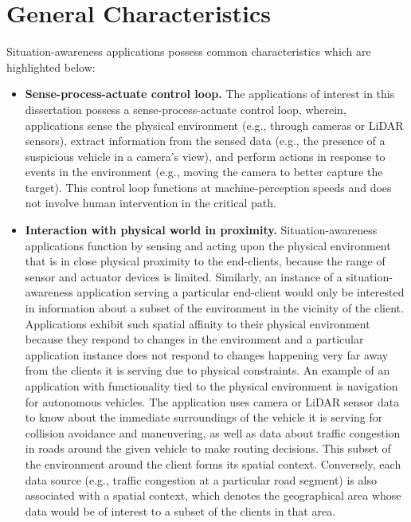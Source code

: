\section{General Characteristics}
\label{sec:app_characteristics}
Situation-awareness applications possess common characteristics which are highlighted below:
\begin{itemize}
\item \textbf{Sense-process-actuate control loop. }  The applications of interest in this dissertation possess a sense-process-actuate control loop, wherein, applications sense the physical environment (e.g., through cameras or LiDAR sensors), extract information from the sensed data (e.g., the presence of a suspicious vehicle in a camera's view), and perform actions in response to events in the environment (e.g., moving the camera to better capture the target). This control loop functions at machine-perception speeds and does not involve human intervention in the critical path.
\item \textbf{Interaction with physical world in proximity. } 
Situation-awareness applications function by sensing and acting upon the physical environment that is in close physical proximity to the end-clients, because the range of sensor and actuator devices is limited. Similarly, an instance of a situation-awareness application serving a particular end-client would only be interested in information about a subset of the environment in the vicinity of the client. Applications exhibit such spatial affinity to their physical environment because they respond to changes in the environment and a particular application instance does not respond to changes happening very far away from the clients it is serving due to physical constraints. An example of an application with functionality tied to the physical environment is navigation for autonomous vehicles. The application uses camera or LiDAR sensor data to know about the immediate surroundings of the vehicle it is serving for collision avoidance and maneuvering, as well as data about traffic congestion in roads around the given vehicle to make routing decisions. This subset of the environment around the client forms its spatial context. Conversely, each data source (e.g., traffic congestion at a particular road segment) is also associated with a spatial context, which denotes the geographical area whose data would be of interest to a subset of the clients in that area.

\end{itemize}
